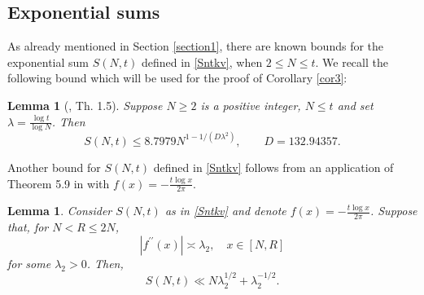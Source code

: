 \documentclass[reqno]{amsart}
\newtheorem{lemma}[theorem]{Lemma}
\numberwithin{equation}{section}
\theoremstyle{remark}
\begin{document}
\subsection{Exponential sums}As already mentioned in Section \ref{section1}, there are known bounds for the exponential sum $S(N,t)$ defined in \eqref{Sntkv}, when $2\le N\le t$. We recall the following bound which will be used for the proof of Corollary \ref{cor3}:
\begin{lemma}[\cite{bellotti2023explicit}, Th. 1.5]\label{expsumbel}
Suppose $N \geq 2$ is a positive integer, $N \leq t$ and set $\lambda=\frac{\log t}{\log N}$. Then
$$
S(N, t) \leq 8.7979 N^{1-1 /\left(D \lambda^2\right)},\qquad D=132.94357.
$$
\end{lemma}
Another bound for $S(N,t)$ defined in \eqref{Sntkv} follows from an application of Theorem 5.9 in \cite{titchmarsh_theory_1986} with $f(x)=-\frac{t\log x}{2\pi}$.
\begin{lemma}\label{secondderiv}
    Consider $S(N,t)$ as in \eqref{Sntkv} and denote $f(x)=-\frac{t\log x}{2\pi}$. Suppose that, for $N<R\le 2N$, $$
\left|f^{\prime \prime}(x)\right| \asymp \lambda_2, \quad x \in[N, R]
$$
for some $\lambda_2>0$. Then,
$$
S(N,t) \ll N \lambda_2^{1 / 2}+\lambda_2^{-1 / 2}.
$$
\end{lemma}
\end{document}
